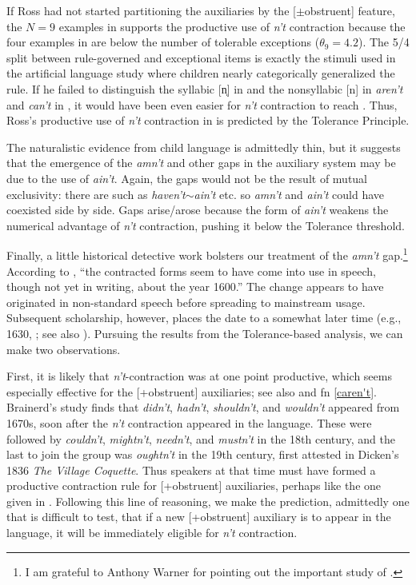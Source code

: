 \documentclass[output=paper,
modfonts
]{LSP/langsci}
\begin{document}
If Ross had not started partitioning the auxiliaries by the
[$\pm$obstruent] feature, the $N=9$ examples in  supports
the productive use of \textit{n't} contraction because the four examples
in  are below the number of tolerable exceptions
($\theta_9 = 4.2$). The 5/4 split between rule-governed and
exceptional items is exactly the stimuli used in the artificial
language study \citep{Schuler2016} where children nearly categorically
generalized the rule. If he failed to distinguish the syllabic [n̩] in
 and the nonsyllabic [n] in \textit{aren't} and \textit{can't}
in , it would have been even easier for \textit{n't}
contraction to reach .  Thus, Ross's productive use of \textit{n't}
contraction in  is  predicted by the Tolerance
Principle. 

The naturalistic evidence from child language  is admittedly thin, but it suggests that
the emergence of the \textit{amn't} and other gaps in 
the auxiliary system may be due to the use of \textit{ain't}. Again, the
gaps would not be the result of mutual exclusivity: there are 
such as \textit{haven't}$\sim$\textit{ain't} etc. so \textit{amn't} and
\textit{ain't} could have coexisted side by side. Gaps arise/arose
because the form of \textit{  ain't} weakens the numerical advantage of
\textit{n't} contraction, pushing it below the Tolerance threshold. 

Finally, a little historical detective work bolsters our treatment of 
the \textit{amn't} gap.\footnote{I am grateful to Anthony Warner for pointing
  out the important study of \citealt{Brainerd1989}.} 
According to \citet[117]{Jespersen1917}, ``the contracted forms seem to
have come into use in speech, though not yet in writing, about the
year 1600.'' The change appears to have originated in non-standard
speech before spreading to mainstream usage.  Subsequent scholarship, however, places the date to a
somewhat later time (e.g., 1630, \citealt[181]{Brainerd1989}; see
also \citealt[208--209]{Warner1993}).
Pursuing the results from the Tolerance-based analysis, we can make
two observations.   

First, it is likely that \textit{n't}-contraction was at one point
productive, which seems especially effective for the [+obstruent]
auxiliaries; see also  and fn \ref{caren't}.
Brainerd's study finds  that \textit{didn't}, \textit{hadn't}, \textit{shouldn't}, and \textit{wouldn't} appeared from 1670s, soon after the
\textit{n't} contraction appeared in the  language. These were
followed  by \textit{couldn't}, \textit{mightn't}, \textit{needn't}, and \textit{mustn't} in the 18th century, and the last to join the group was
\textit{oughtn't} in the 19th century, first attested in Dicken's 1836
\textit{The Village 
  Coquette}. 
  Thus  speakers at  that time  must have formed a  productive
  contraction rule  for [+obstruent] auxiliaries, perhaps like the one
  given in .  
Following this line of reasoning, we  make the prediction, admittedly
one that is difficult to test, that if a new [+obstruent] auxiliary is
to appear in the language, it will be immediately eligible for \textit{n't} contraction.  
\end{document}
